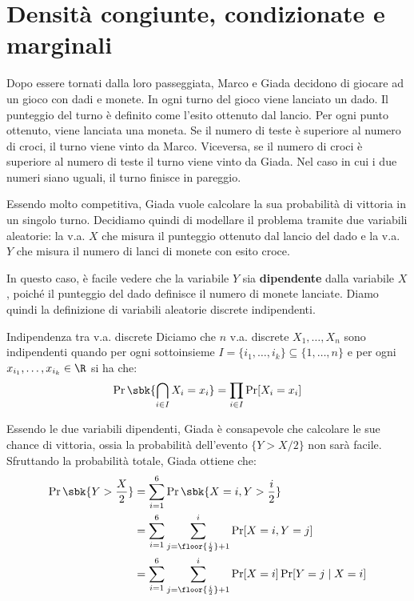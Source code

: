 \documentclass[a4paper, 12pt]{report}
\begin{document}
    \section{Densità congiunte, condizionate e marginali}

    \label{va_cong_cond_marg}
    Dopo essere tornati dalla loro passeggiata, Marco e Giada decidono di giocare ad un gioco con dadi e monete. In ogni turno del gioco viene lanciato un dado. Il punteggio del turno è definito come l'esito ottenuto dal lancio. Per ogni punto ottenuto, viene lanciata una moneta. Se il numero di teste è superiore al numero di croci, il turno viene vinto da Marco. Viceversa, se il numero di croci è superiore al numero di teste il turno viene vinto da Giada. Nel caso in cui i due numeri siano uguali, il turno finisce in pareggio.

    Essendo molto competitiva, Giada vuole calcolare la sua probabilità di vittoria in un singolo turno. Decidiamo quindi di modellare il problema tramite due variabili aleatorie: la v.a. $X$ che misura il punteggio ottenuto dal lancio del dado e la v.a. $Y$ che misura il numero di lanci di monete con esito croce.
    
    In questo caso, è facile vedere che la variabile $Y$ sia \textbf{dipendente} dalla variabile $X$, poiché il punteggio del dado definisce il numero di monete lanciate. Diamo quindi la definizione di variabili aleatorie discrete indipendenti.

    \begin{frameddefn}{Indipendenza tra v.a. discrete}
        Diciamo che $n$ v.a. discrete $X_1, \ldots, X_n$ sono indipendenti quando per ogni sottoinsieme $I = \{i_1, \ldots, i_k\} \subseteq \{1,\ldots,n\}$ e per ogni $x_{i_1}, \ldots, x_{i_k} \in \R$ si ha che:
        \[\Pr\sbk{\bigcap_{i \in I} X_i = x_i} = \prod_{i \in I} \Pr[X_i = x_i]\]
    \end{frameddefn}
    
    Essendo le due variabili dipendenti, Giada è consapevole che calcolare le sue chance di vittoria, ossia la probabilità dell'evento $\{Y > X/2\}$ non sarà facile. Sfruttando la probabilità totale, Giada ottiene che:
    \[\begin{split}
        \Pr\sbk{Y > \frac{X}{2}} &= \sum_{i = 1}^{6} \Pr\sbk{X = i, Y > \frac{i}{2}} \\
        &= \sum_{i = 1}^{6} \sum_{j = \floor{\frac{i}{2}}+1}^i \Pr[X = i, Y = j] \\
        &= \sum_{i = 1}^{6} \sum_{j = \floor{\frac{i}{2}}+1}^i \Pr[X = i] \Pr[Y = j \mid X = i]\\
    \end{split}\]
\end{document}
